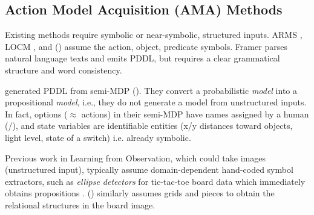 \documentclass[11pt]{article}
\begin{document}
\subsection{Action Model Acquisition (AMA) Methods}

Existing methods require symbolic
or near-symbolic, structured inputs. ARMS \cite{YangWJ07}, LOCM
\cite{CresswellMW13}, and \citeauthor{MouraoZPS12} (\citeyear{MouraoZPS12})
assume the action, object, predicate symbols.
% 
Framer \cite{lindsay2017framer} parses natural language texts and emits PDDL,
but requires a clear grammatical structure and word consistency. %

\citeauthor{KonidarisKL14} generated PDDL from
semi-MDP (\citeyear{KonidarisKL14}).
% 
They convert a probabilistic \emph{model} into a propositional \emph{model},
i.e., they do not generate a model from unstructured inputs.
In fact, options ($\approx$ actions) in their semi-MDP have names assigned by a human (/),
and state variables are identifiable entities
(x/y distances toward objects, light level, state of a switch) i.e. already symbolic.


Previous work in Learning from Observation, which could take images (unstructured input),
typically assume domain-dependent hand-coded symbol extractors,
such as \emph{ellipse detectors} for tic-tac-toe board data
which immediately obtains propositions \cite{BarbuNS10}.
\citeauthor{Kaiser12} (\citeyear{Kaiser12}) similarly assumes grids and pieces
to obtain the relational structures in the board image.
\end{document}
